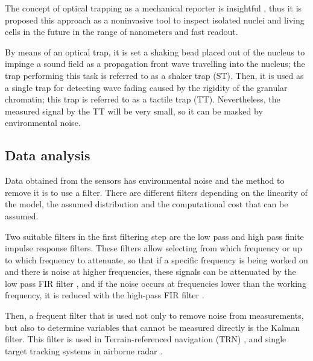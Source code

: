 \documentclass[12pt, a4paper]{article} %
\begin{document}
The concept of optical trapping as a mechanical reporter is insightful \cite{ashkin20182018}, thus it is proposed this approach as a noninvasive tool to inspect isolated nuclei and living cells in the future in the range of nanometers and fast readout.

\newpage

By means of an optical trap, it is set a shaking bead placed out of the nucleus to impinge a sound field as a propagation front wave travelling into the nucleus; the trap performing this task is referred to as a shaker trap (ST). Then, it is used as a single trap for detecting wave fading caused by the rigidity of the granular chromatin; this trap is referred to as a tactile trap (TT). Nevertheless, the measured signal by the TT will be very small, so it can be masked by environmental noise. 

\setlength{\parskip}{0mm}

\subsection{Data analysis}

Data obtained from the sensors has environmental noise and the method to remove it is to use a filter. There are different filters depending on the linearity of the model, the assumed distribution and the computational cost that can be assumed. 

\setlength{\parskip}{4mm}

Two suitable filters in the first filtering step are the low pass and high pass finite impulse response filters. These filters allow selecting from which frequency or up to which frequency to attenuate, so that if a specific frequency is being worked on and there is noise at higher frequencies, these signals can be attenuated by the low pass FIR filter \cite{rabiner1973approximate}, and if the noise occurs at frequencies lower than the working frequency, it is reduced with the high-pass FIR filter \cite{mondal2012novel}.

Then, a frequent filter that is used not only to remove noise from measurements, but also to determine variables that cannot be measured directly is the Kalman filter. This filter is used in Terrain-referenced navigation (TRN) \cite{kim2018introduction}, and single target tracking systems in airborne radar \cite{pearson1974Kalman}. 
\end{document}

